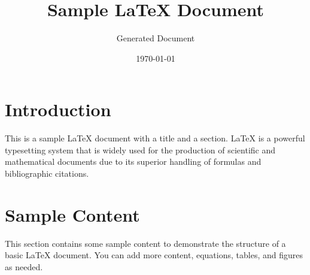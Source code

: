 \documentclass{article}
\title{Sample LaTeX Document}
\author{Generated Document}
\date{\today}
\begin{document}
\maketitle

\section{Introduction}
This is a sample LaTeX document with a title and a section. LaTeX is a powerful typesetting system that is widely used for the production of scientific and mathematical documents due to its superior handling of formulas and bibliographic citations.

\section{Sample Content}
This section contains some sample content to demonstrate the structure of a basic LaTeX document. You can add more content, equations, tables, and figures as needed.
\end{document}
